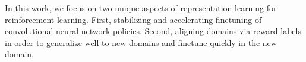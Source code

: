 \documentclass{article}
\begin{document}
In this work, we focus on two unique aspects of representation learning for reinforcement learning. First, stabilizing and accelerating finetuning of convolutional neural network policies. Second, aligning domains via reward labels in order to generalize well to new domains and finetune quickly in the new domain.
\end{document}
